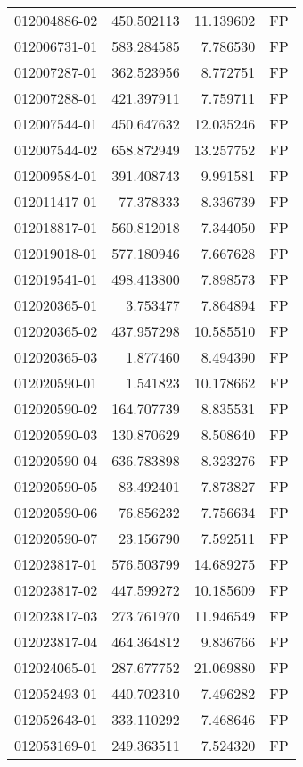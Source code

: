 \begin{tabular}{lrrl}
012004886-02 &  450.502113 &    11.139602 &   FP \\
012006731-01 &  583.284585 &     7.786530 &   FP \\
012007287-01 &  362.523956 &     8.772751 &   FP \\
012007288-01 &  421.397911 &     7.759711 &   FP \\
012007544-01 &  450.647632 &    12.035246 &   FP \\
012007544-02 &  658.872949 &    13.257752 &   FP \\
012009584-01 &  391.408743 &     9.991581 &   FP \\
012011417-01 &   77.378333 &     8.336739 &   FP \\
012018817-01 &  560.812018 &     7.344050 &   FP \\
012019018-01 &  577.180946 &     7.667628 &   FP \\
012019541-01 &  498.413800 &     7.898573 &   FP \\
012020365-01 &    3.753477 &     7.864894 &   FP \\
012020365-02 &  437.957298 &    10.585510 &   FP \\
012020365-03 &    1.877460 &     8.494390 &   FP \\
012020590-01 &    1.541823 &    10.178662 &   FP \\
012020590-02 &  164.707739 &     8.835531 &   FP \\
012020590-03 &  130.870629 &     8.508640 &   FP \\
012020590-04 &  636.783898 &     8.323276 &   FP \\
012020590-05 &   83.492401 &     7.873827 &   FP \\
012020590-06 &   76.856232 &     7.756634 &   FP \\
012020590-07 &   23.156790 &     7.592511 &   FP \\
012023817-01 &  576.503799 &    14.689275 &   FP \\
012023817-02 &  447.599272 &    10.185609 &   FP \\
012023817-03 &  273.761970 &    11.946549 &   FP \\
012023817-04 &  464.364812 &     9.836766 &   FP \\
012024065-01 &  287.677752 &    21.069880 &   FP \\
012052493-01 &  440.702310 &     7.496282 &   FP \\
012052643-01 &  333.110292 &     7.468646 &   FP \\
012053169-01 &  249.363511 &     7.524320 &   FP \\

\end{tabular}
